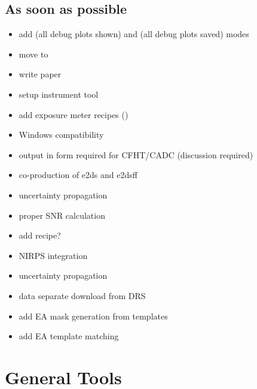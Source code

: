 \documentclass[a4paper,10pt,english]{report}
\begin{document}
\subsection{As soon as possible}
\label{\detokenize{user/general/todo:as-soon-as-possible}}\begin{itemize}
\item {} 
add  (all debug plots shown) and  (all debug plots saved) modes

\item {} 
move  to 

\item {} 
write  paper

\item {} 
setup instrument tool

\item {} 
add exposure meter recipes ()

\item {} 
Windows compatibility

\item {} 
output in form required for CFHT/CADC (discussion required)

\item {} 
co-production of e2ds and e2dsff

\item {} 
uncertainty propagation

\item {} 
proper SNR calculation

\item {} 
add  recipe?

\item {} 
NIRPS integration

\item {} 
uncertainty propagation

\item {} 
data separate download from DRS

\item {} 
add EA mask generation from templates

\item {} 
add EA template matching

\end{itemize}


\section{General Tools}
\label{\detokenize{user/general/tools_default:general-tools}}\label{\detokenize{user/general/tools_default:tools-default}}\label{\detokenize{user/general/tools_default::doc}}
\end{document}
